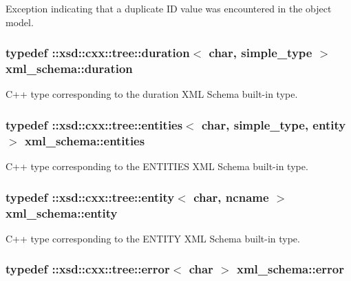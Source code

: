 Exception indicating that a duplicate I\+D value was encountered in the object model. 

\hypertarget{namespacexml__schema_acd79b4620c053b211a2e739daed3b2bf}{
\subsubsection[{duration}]{\setlength{\rightskip}{0pt plus 5cm}typedef \+::xsd\+::cxx\+::tree\+::duration$<$ char, {\bf simple\+\_\+type} $>$ {\bf xml\+\_\+schema\+::duration}}}\label{namespacexml__schema_acd79b4620c053b211a2e739daed3b2bf}


C++ type corresponding to the duration X\+M\+L Schema built-\/in type. 

\hypertarget{namespacexml__schema_ad9a0d0d60ff45d5f4a4086a502b9599b}{
\subsubsection[{entities}]{\setlength{\rightskip}{0pt plus 5cm}typedef \+::xsd\+::cxx\+::tree\+::entities$<$ char, {\bf simple\+\_\+type}, {\bf entity} $>$ {\bf xml\+\_\+schema\+::entities}}}\label{namespacexml__schema_ad9a0d0d60ff45d5f4a4086a502b9599b}


C++ type corresponding to the E\+N\+T\+I\+T\+I\+E\+S X\+M\+L Schema built-\/in type. 

\hypertarget{namespacexml__schema_a871d3ae7ead81c6fc7ff7d37cd5f4c8f}{
\subsubsection[{entity}]{\setlength{\rightskip}{0pt plus 5cm}typedef \+::xsd\+::cxx\+::tree\+::entity$<$ char, {\bf ncname} $>$ {\bf xml\+\_\+schema\+::entity}}}\label{namespacexml__schema_a871d3ae7ead81c6fc7ff7d37cd5f4c8f}


C++ type corresponding to the E\+N\+T\+I\+T\+Y X\+M\+L Schema built-\/in type. 

\hypertarget{namespacexml__schema_a13e2122658f2abee3c2da9829f2de129}{
\subsubsection[{error}]{\setlength{\rightskip}{0pt plus 5cm}typedef \+::xsd\+::cxx\+::tree\+::error$<$ char $>$ {\bf xml\+\_\+schema\+::error}}}\label{namespacexml__schema_a13e2122658f2abee3c2da9829f2de129}


